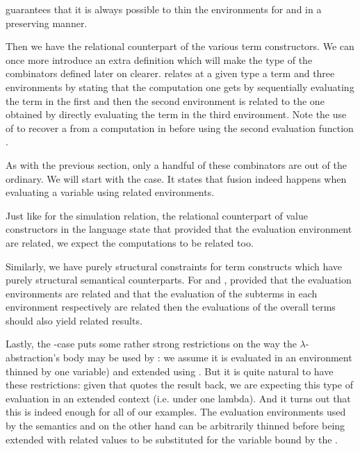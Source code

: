  guarantees that it is always possible to thin the environments
for  and  in a  preserving manner.


Then we have the relational counterpart of the various term constructors. We can once
more introduce an extra definition  which will make the type of the combinators
defined later on clearer.  relates at a given type a term and three environments
by stating that the computation one gets by sequentially evaluating the term in the first
and then the second environment is related to the one obtained by directly evaluating
the term in the third environment. Note the use of  to recover a 
from a computation in  before using the second evaluation function .


As with the previous section, only a handful of these combinators are out
of the ordinary. We will start with the  case. It states that
fusion indeed happens when evaluating a variable using related environments.


Just like for the simulation relation, the relational counterpart of value constructors
in the language state that provided that the evaluation environment are related,
we expect the computations to be related too.


Similarly, we have purely structural constraints for term constructs which have purely
structural semantical counterparts. For  and , provided that the
evaluation environments are related and that the evaluation of the subterms in each
environment respectively are related then the evaluations of the overall terms should
also yield related results.


Lastly, the -case puts some rather strong restrictions on the way the
$λ$-abstraction's body may be used by : we assume it is evaluated in an
environment thinned by one variable) and extended using . But it is
quite natural to have these restrictions: given that  quotes the
result back, we are expecting this type of evaluation in an extended context
(i.e. under one lambda). And it turns out that this is indeed enough for all of
our examples. The evaluation environments used by the semantics  and
 on the other hand can be arbitrarily thinned before being extended with
related values to be substituted for the variable bound by the .

